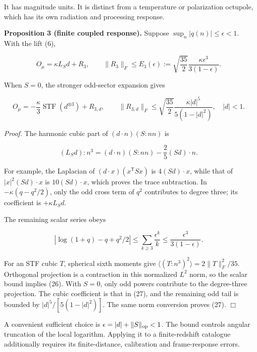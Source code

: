 \documentclass[aps,prd,reprint,onecolumn,11pt,nofootinbib,notitlepage]{revtex4-2}
\begin{document}
It has magnitude units. It is distinct from a temperature or polarization octupole, which has its own radiation and processing response.

\textbf{Proposition 3 (finite coupled response).} Suppose \(\sup_n|q(n)|\le\epsilon<1\). With the lift (6),

\begin{equation}
 O_\mu=\kappa L_Sd+R_3,\qquad
 \|R_3\|_F\le E_3(\epsilon)
 :=\sqrt{\frac{35}{2}}\frac{\kappa\epsilon^3}{3(1-\epsilon)}.
 \tag{26}
\end{equation}

When \(S=0\), the stronger odd-sector expansion gives

\begin{equation}
 O_\mu=-\frac\kappa3\operatorname{STF}(d^{\otimes3})+R_{3,d},\qquad
 \|R_{3,d}\|_F\le\sqrt{\frac{35}{2}}
       \frac{\kappa|d|^5}{5(1-|d|^2)},\quad |d|<1.
 \tag{27}
\end{equation}

\emph{Proof.} The harmonic cubic part of \((d\cdot n)(S:nn)\) is

\begin{equation}
 (L_Sd):n^3=(d\cdot n)(S:nn)-\frac25(Sd)\cdot n.
 \tag{28}
\end{equation}

For example, the Laplacian of \((d\cdot x)(x^{\mathsf T}Sx)\) is \(4(Sd)\cdot x\), while that of \(|x|^2(Sd)\cdot x\) is \(10(Sd)\cdot x\), which proves the trace subtraction. In \(-\kappa(q-q^2/2)\), only the odd cross term of \(q^2\) contributes to degree three; its coefficient is \(+\kappa L_Sd\).

The remaining scalar series obeys

\begin{equation}
 \left|\log(1+q)-q+q^2/2\right|
 \le\sum_{k\ge3}\frac{\epsilon^k}{k}
 \le\frac{\epsilon^3}{3(1-\epsilon)}.
 \tag{29}
\end{equation}

For an STF cubic \(T\), spherical sixth moments give \(\langle(T:n^3)^2\rangle=2\|T\|_F^2/35\). Orthogonal projection is a contraction in this normalized \(L^2\) norm, so the scalar bound implies (26). With \(S=0\), only odd powers contribute to the degree-three projection. The cubic coefficient is that in (27), and the remaining odd tail is bounded by \(|d|^5/[5(1-|d|^2)]\). The same norm conversion proves (27). \(\Box\)

A convenient sufficient choice is \(\epsilon=|d|+\|S\|_{\rm op}<1\). The bound controls angular truncation of the local logarithm. Applying it to a finite-redshift catalogue additionally requires its finite-distance, calibration and frame-response errors.
\end{document}
